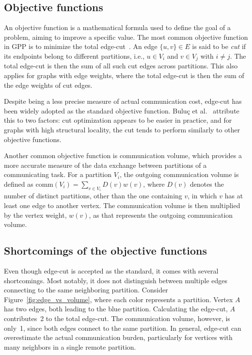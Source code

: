 \subsection{Objective functions}\label{subs:objective_functions}
An objective function is a mathematical formula used to define the goal of a problem, aiming to improve a specific value. The most common objective function in GPP is to minimize the total edge-cut~\cite{buluc_recent_2016}. An edge $\{u, v\} \in E$ is said to be \textit{cut} if its endpoints belong to different partitions, i.e., $u \in V_i$ and $v \in V_j$ with $i \neq j$. The total edge-cut is then the sum of all such cut edges across partitions. This also applies for graphs with edge weights, where the total edge-cut is then the sum of the edge weights of cut edges. 

Despite being a less precise measure of actual communication cost, edge-cut has been widely adopted as the standard objective function. Buluç et al.~\cite{buluc_recent_2016} attribute this to two factors: cut optimization appears to be easier in practice, and for graphs with high structural locality, the cut tends to perform similarly to other objective functions. 

Another common objective function is communication volume, which provides a more accurate measure of the data exchange between partitions of a communicating task. For a partition $V_i$, the outgoing communication volume is defined as $\text{comm}(V_i) = \sum_{v \in V_i} D(v)w(v)$, where $D(v)$ denotes the number of distinct partitions, other than the one containing $v$, in which $v$ has at least one edge to another vertex. The communication volume is then multiplied by the vertex weight, $w(v)$, as that represents the outgoing communication volume.

\subsection{Shortcomings of the objective functions}
Even though edge-cut is accepted as the standard, it comes with several shortcomings. Most notably, it does not distinguish between multiple edges connecting to the same neighboring partition. Consider Figure~\ref{fig:edge_vs_volume}, where each color represents a partition. Vertex $A$ has two edges, both leading to the blue partition. Calculating the edge-cut, $A$ contributes~2 to the total edge-cut. The communication volume, however, is only~1, since both edges connect to the same partition. In general, edge-cut can overestimate the actual communication burden, particularly for vertices with many neighbors in a single remote partition.

